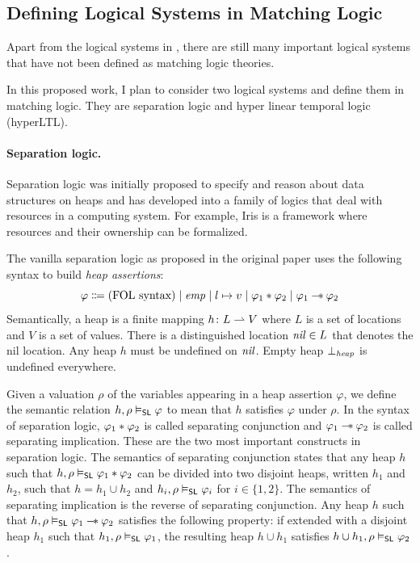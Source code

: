 \documentclass[11pt]{article}
\begin{document}
\subsection{Defining Logical Systems in Matching Logic}
\label{sec:proposed-logics}

Apart from the logical systems in , 
there are still many important logical systems that have not been defined as 
matching logic theories. 

In this proposed work, I plan to consider two logical systems
and define them in matching logic.
They are separation logic and hyper linear temporal logic (hyperLTL).

\paragraph{Separation logic.}

Separation logic \cite{Rey02} was initially proposed to specify and reason about 
data structures on heaps and has developed into a family of logics that deal 
with resources in a computing system.
For example, Iris \cite{iris} is a framework where resources and their 
ownership can be formalized. 

The vanilla separation logic as proposed in the original paper \cite{Rey02}
uses the following syntax to build \emph{heap assertions}:
$$
\varphi \Coloneqq \text{(FOL syntax)}
\mid \mathit{emp} \mid l \mapsto v \mid \varphi_1 \mathbin{*} \varphi_2 \mid
\varphi_1 \mathbin{-\!*} \varphi_2
$$
Semantically, a heap is a finite mapping  $h \colon L \rightharpoonup V$
where $L$ is a set of locations and $V$ is a set of values. 
There is a distinguished location $\mathit{nil} \in L$ that denotes the nil location.
Any heap $h$ must be undefined on $\mathit{nil}$. 
Empty heap $\bot_\mathit{heap}$ is undefined everywhere. 

Given a valuation $\rho$ of the variables appearing in a heap assertion 
$\varphi$, 
we define the semantic relation
$h,\rho \vDash_\mathsf{SL} \varphi$ to mean that $h$ satisfies $\varphi$ under $\rho$. 
In the syntax of separation logic, 
$\varphi_1 \mathbin{*} \varphi_2$ is called separating conjunction and 
$\varphi_1 \mathbin{-\!*} \varphi_2$ is called separating implication. 
These are the two most important constructs in separation logic. 
The semantics of separating conjunction states that any heap $h$
such that $h,\rho \vDash_\mathsf{SL} \varphi_1 \mathbin{*} \varphi_2$
can be divided into two disjoint heaps, written $h_1$ and $h_2$, such that
$h = h_1 \cup h_2$ and 
$h_i,\rho \vDash_\mathsf{SL} \varphi_i$ for $i \in \{1,2\}$. 
The semantics of separating implication is the reverse of separating 
conjunction.
Any heap $h$ such that
$h,\rho \vDash_\mathsf{SL} \varphi_1 \mathbin{-\!*} \varphi_2$ satisfies the following property:
if extended with a disjoint heap $h_1$ such that
$h_1,\rho \vDash_\mathsf{SL} \varphi_1$, 
the resulting heap $h \cup h_1$ satisfies
$h \cup h_1 ,\rho \vDash_\mathsf{SL} \varphi_2$. 
\end{document}
